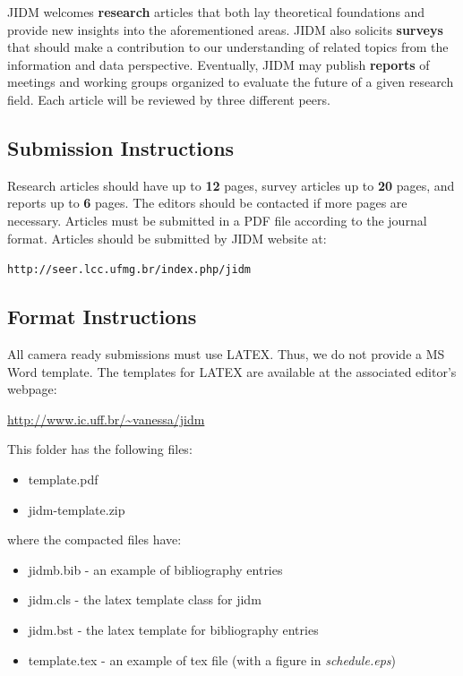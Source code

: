 \documentclass[jidm,a4paper]{jidm} %
\begin{document}
JIDM welcomes \textbf{research} articles that both lay theoretical foundations and provide new insights into the aforementioned areas. JIDM also solicits \textbf{surveys} that should make a contribution to our understanding of related topics from the information and data perspective. Eventually, JIDM may publish \textbf{reports} of meetings and working groups organized to evaluate the future of a given research field. Each article will be reviewed by three different peers. 


\subsection{Submission Instructions}

Research articles should have up to \textbf{12} pages, survey articles up to \textbf{20} pages, and reports up to \textbf{6} pages. The editors should be contacted if more pages are necessary. Articles must be submitted in a PDF file according to the journal format.
Articles should be submitted by JIDM website at: 

\begin{center}
\texttt{http://seer.lcc.ufmg.br/index.php/jidm}
\end{center}



\subsection{Format Instructions}

All camera ready submissions must use LATEX. Thus, we do not provide a MS Word template. The templates for LATEX are available at the associated editor's webpage:

\begin{center}
\url{http://www.ic.uff.br/~vanessa/jidm}
\end{center}

This folder has the following files:

\begin{itemize}
	\item template.pdf
	\item jidm-template.zip
\end{itemize}

where the compacted files have: 

\begin{itemize}
	\item jidmb.bib - an example of bibliography entries
	\item jidm.cls - the latex template class for jidm
	\item jidm.bst - the latex template for bibliography entries
	\item template.tex - an example of tex file (with a figure in \textit{schedule.eps})
\end{itemize}
\end{document}
